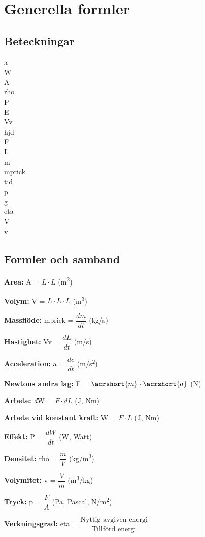 \chapter{Generella formler}
\section*{Beteckningar}

\acrfull{a}\\
\acrfull{W}\\
\acrfull{A}\\
\acrfull{rho}\\
\acrfull{P}\\
\acrfull{E}\\
\acrfull{Vv}\\
\acrfull{hjd}\\
\acrfull{F}\\
\acrfull{L}\\
\acrfull{m}\\
\acrfull{mprick}\\
\acrfull{tid}\\
\acrfull{p}\\
\acrfull{g}\\
\acrfull{eta}\\
\acrfull{V}\\
\acrfull{v}

\section*{Formler och samband}
	\textbf{Area:} \acrshort{A} = $L\cdot L $  (m\textsuperscript{2}) \par 
	\textbf{Volym:} \acrshort{V} = $L\cdot L\cdot L $   (m\textsuperscript{3}) \par
	\textbf{Massflöde:} \acrshort{mprick} = $\dfrac{dm}{dt}$  (kg/s) \par
	\textbf{Hastighet:} \acrshort{Vv} = $\dfrac{dL}{dt} $  (m/s) \par
	\textbf{Acceleration:} \acrshort{a} = $\dfrac{dc}{dt} $   (m/s\textsuperscript{2}) \par
	\textbf{Newtons andra lag: } \acrshort{F} = $\acrshort{m} \cdot \acrshort{a}$ (N) \par
	\textbf{Arbete:} \textit{d}\acrshort{W} = $F\cdot dL  $  (J, Nm) \par
	\textbf{Arbete vid konstant kraft:} \acrshort{W} = $ F \cdot L $  (J, Nm) \par
	\textbf{Effekt:} \acrshort{P} = $\dfrac{dW}{dt} $  (W, Watt) \par
	\textbf{Densitet:} \acrshort{rho} = $\dfrac{m}{V} $  (kg/m\textsuperscript{3}) \par
	\textbf{Volymitet:} \acrshort{v} = $\dfrac{V}{m} $  (m\textsuperscript{3}/kg) \par
	\textbf{Tryck:} \acrshort{p} = $ \dfrac{F}{A} $   (Pa, Pascal, N/m\textsuperscript{2}) \par
	\textbf{Verkningsgrad:} \acrshort{eta} = $\dfrac{\text{Nyttig avgiven energi}}{\text{Tillförd energi}} $ \par

